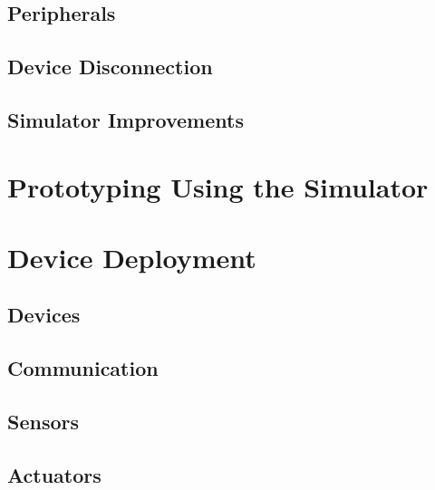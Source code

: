 \subsection{Peripherals}
\subsection{Device Disconnection}
\subsection{Simulator Improvements}

\section{Prototyping Using the Simulator}

\section{Device Deployment}
\subsection{Devices}
\subsection{Communication}
\subsection{Sensors}
\subsection{Actuators}
